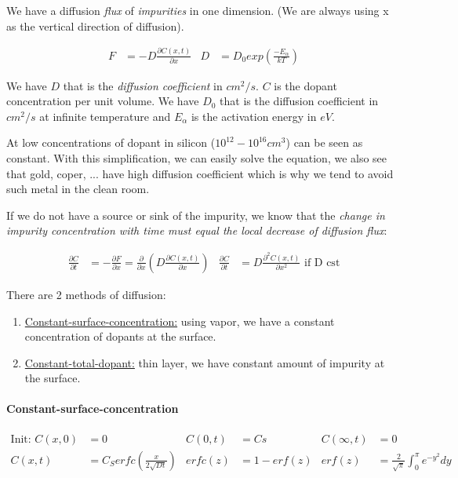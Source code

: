 \documentclass[
]{article}
\begin{document}
We have a diffusion \emph{flux} of \emph{impurities} in one dimension.
(We are always using x as the vertical direction of diffusion).

\[\begin{aligned}
    F &= - D \frac{\partial C(x,t)}{\partial x} & D &= D_0 exp\left( \frac{-E_{\alpha}}{kT} \right)
\end{aligned}\]

We have \(D\) that is the \emph{diffusion coefficient} in \(cm^2/s\).
\(C\) is the dopant concentration per unit volume. We have \(D_0\) that
is the diffusion coefficient in \(cm^2/s\) at infinite temperature and
\(E_\alpha\) is the activation energy in \(eV\).

At low concentrations of dopant in silicon (\(10^{12} - 10^{16} cm^3\))
can be seen as constant. With this simplification, we can easily solve
the equation, we also see that gold, coper, ... have high diffusion
coefficient which is why we tend to avoid such metal in the clean room.

If we do not have a source or sink of the impurity, we know that the
\emph{change in impurity concentration with time must equal the local
decrease of diffusion flux}:

\[\begin{aligned}
    \frac{\partial C}{\partial t} &= - \frac{\partial F}{\partial x} = \frac{\partial}{\partial x} \left( D\frac{\partial C(x,t)}{\partial x} \right) & \frac{\partial C}{\partial t} &=  D\frac{\partial^2 C(x,t)}{\partial x^2} \text{ if D cst}
\end{aligned}\]

There are 2 methods of diffusion:

\begin{enumerate}
\def\labelenumi{\arabic{enumi}.}
\item
  \ul{Constant-surface-concentration:} using vapor, we have a constant
  concentration of dopants at the surface.
\item
  \ul{Constant-total-dopant:} thin layer, we have constant amount of
  impurity at the surface.
\end{enumerate}

\paragraph{Constant-surface-concentration}\label{constant-surface-concentration}

\[\begin{aligned}
    \text{Init: } C(x,0) &= 0 & C(0,t) &= Cs & C(\infty, t) &=0\\
    C(x,t) &= C_S erfc\left( \frac{x}{2\sqrt{Dt}} \right) & erfc(z) &= 1-erf(z) & erf(z)&=\frac{2}{\sqrt{\pi}}\int_0^\pi e^{-y^2} dy
\end{aligned}\]
\end{document}
